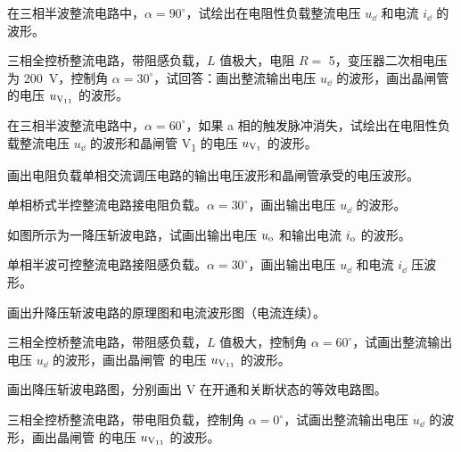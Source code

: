 \documentclass[电力电子]{subfiles}
\begin{document}
\begin{ti}[10 分]
	在三相半波整流电路中，$\alpha = 90^\circ$，试绘出在电阻性负载整流电压 $u_{\dd}$ 和电流 $i_{\dd}$ 的波形。
\end{ti}

\begin{ti}[10 分]
	三相全控桥整流电路，带阻感负载，$L$ 值极大，电阻 $R =$ \SI{5}{\Omega}，变压器二次相电压为 \SI{200}{V}，控制角 $\alpha = 30^\circ$，试回答：画出整流输出电压 $u_{\dd}$ 的波形，画出晶闸管 \V 的电压 $u_{\text{V\textsubscript{11}}}$ 的波形。
\end{ti}

\begin{ti}[10 分]
	在三相半波整流电路中，$\alpha = 60^\circ$，如果 a 相的触发脉冲消失，试绘出在电阻性负载整流电压 $u_{\dd}$ 的波形和晶闸管 V\textsubscript{1} 的电压 $u_{\text{V\textsubscript{1}}}$ 的波形。
\end{ti}

\begin{ti}[10 分]
	画出电阻负载单相交流调压电路的输出电压波形和晶闸管承受的电压波形。
\end{ti}

\begin{ti}[5 分]
	单相桥式半控整流电路接电阻负载。$\alpha = 30^\circ$，画出输出电压 $u_{\dd}$ 的波形。
\end{ti}

\begin{ti}[10 分]
	如图所示为一降压斩波电路，试画出输出电压 $u_{\mathrm{o}}$ 和输出电流 $i_{\mathrm{o}}$ 的波形。
\end{ti}

\begin{ti}[10 分]
	单相半波可控整流电路接阻感负载。$\alpha = 30^\circ$，画出输出电压 $u_{\dd}$ 和电流 $i_{\dd}$ 压波形。
\end{ti}

\begin{ti}[10 分]
	画出升降压斩波电路的原理图和电流波形图（电流连续）。
\end{ti}

\begin{ti}[10 分]
	三相全控桥整流电路，带阻感负载，$L$ 值极大，控制角 $\alpha = 60^\circ$，试画出整流输出电压 $u_{\dd}$ 的波形，画出晶闸管 \V 的电压 $u_{\text{V\textsubscript{11}}}$ 的波形。
\end{ti}

\begin{ti}[10 分]
	画出降压斩波电路图，分别画出 V 在开通和关断状态的等效电路图。
\end{ti}

\begin{ti}[10 分]
	三相全控桥整流电路，带电阻负载，控制角 $\alpha = 0^\circ$，试画出整流输出电压 $u_{\dd}$ 的波形，画出晶闸管 \V 的电压 $u_{\text{V\textsubscript{11}}}$ 的波形。
\end{ti}
\end{document}
